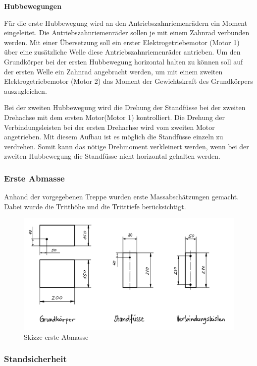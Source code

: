 \newpage

\textbf{Hubbewegungen}

Für die erste Hubbewegung wird an den Antriebszahnriemenrädern ein Moment eingeleitet. Die Antriebszahnriemenräder sollen je mit einem Zahnrad verbunden werden. Mit einer Übersetzung soll ein erster Elektrogetriebemotor (Motor 1) über eine zusätzliche Welle diese Antriebszahnriemenräder antrieben. Um den Grundkörper bei der ersten Hubbewegung horizontal halten zu können soll auf der ersten Welle ein Zahnrad angebracht werden, um mit einem zweiten Elektrogetriebemotor (Motor 2) das Moment der Gewichtskraft des Grundkörpers auszugleichen.

Bei der zweiten Hubbewegung wird die Drehung der Standfüsse bei der zweiten Drehachse mit dem ersten Motor(Motor 1) kontrolliert. Die Drehung der Verbindungsleisten bei der ersten Drehachse wird vom zweiten Motor angetrieben. Mit diesem Aufbau ist es möglich die Standfüsse einzeln zu verdrehen. Somit kann das nötige Drehmoment verkleinert werden, wenn bei der zweiten Hubbewegung die Standfüsse nicht horizontal gehalten werden.


\subsubsection{Erste Abmasse}

Anhand der vorgegebenen Treppe wurden erste Massabschätzungen gemacht. Dabei wurde die Tritthöhe und die Tritttiefe berücksichtigt.

\begin{figure}[H]
  \includegraphics[width=1
  \textwidth]{img/Treppensteigen/Erste Abmasse}
  \centering
  \caption{Skizze erste Abmasse}
\end{figure}

\newpage

\subsubsection{Standsicherheit}

